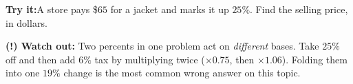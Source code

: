 \documentclass[12pt]{article}
\begin{document}
\begin{tryitbox}
\textbf{Try it:}\quad A store pays \$$65$ for a jacket and marks it up $25\%$.
Find the selling price, in dollars.\\[2pt]
\end{tryitbox}

\begin{watchoutbox}
\textbf{(!) Watch out:} Two percents in one problem act on \emph{different}
bases. Take $25\%$ off and then add $6\%$ tax by multiplying twice
($\times 0.75$, then $\times 1.06$). Folding them into one $19\%$ change is the
most common wrong answer on this topic.
\end{watchoutbox}
\end{document}
